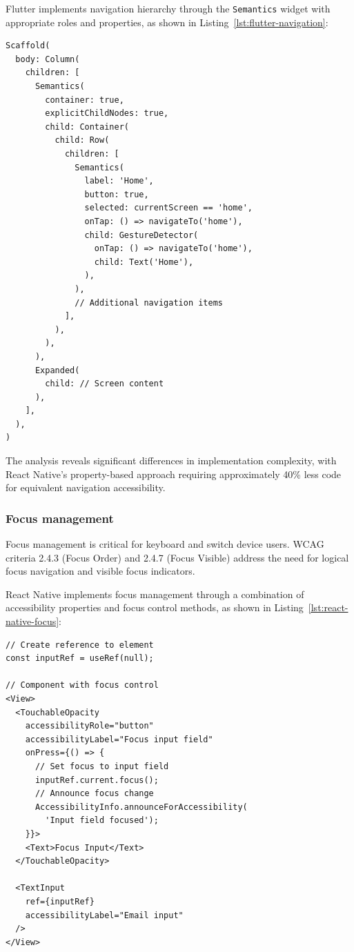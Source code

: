 Flutter implements navigation hierarchy through the \texttt{Semantics} widget with appropriate roles and properties, as shown in Listing~\ref{lst:flutter-navigation}:

\begin{lstlisting}[style=DartStyle, caption=Navigation hierarchy in Flutter, label=lst:flutter-navigation]
Scaffold(
  body: Column(
    children: [
      Semantics(
        container: true,
        explicitChildNodes: true,
        child: Container(
          child: Row(
            children: [
              Semantics(
                label: 'Home',
                button: true,
                selected: currentScreen == 'home',
                onTap: () => navigateTo('home'),
                child: GestureDetector(
                  onTap: () => navigateTo('home'),
                  child: Text('Home'),
                ),
              ),
              // Additional navigation items
            ],
          ),
        ),
      ),
      Expanded(
        child: // Screen content
      ),
    ],
  ),
)
\end{lstlisting}

\pagebreak

The analysis reveals significant differences in implementation complexity, with React Native's property-based approach requiring approximately 40\% less code for equivalent navigation accessibility.

\subsubsection{Focus management}
\label{subsubsec:focus-management}

Focus management is critical for keyboard and switch device users. WCAG criteria 2.4.3 (Focus Order) and 2.4.7 (Focus Visible) address the need for logical focus navigation and visible focus indicators.

React Native implements focus management through a combination of accessibility properties and focus control methods, as shown in Listing~\ref{lst:react-native-focus}:

\begin{lstlisting}[style=ReactNativeStyle, caption=Focus management in React Native, label=lst:react-native-focus]
// Create reference to element
const inputRef = useRef(null);

// Component with focus control
<View>
  <TouchableOpacity
    accessibilityRole="button"
    accessibilityLabel="Focus input field"
    onPress={() => {
      // Set focus to input field
      inputRef.current.focus();
      // Announce focus change
      AccessibilityInfo.announceForAccessibility(
        'Input field focused');
    }}>
    <Text>Focus Input</Text>
  </TouchableOpacity>
  
  <TextInput
    ref={inputRef}
    accessibilityLabel="Email input"
  />
</View>
\end{lstlisting}

